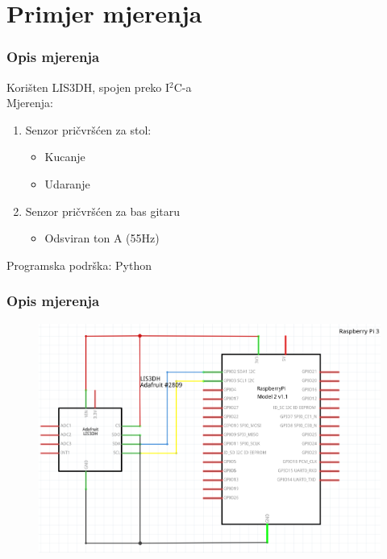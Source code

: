 \documentclass[12pt]{beamer}
\begin{document}
\section{Primjer mjerenja}
\begin{frame}
	\frametitle{Opis mjerenja}
	Korišten LIS3DH, spojen preko I$^2$C-a \\
	Mjerenja:
	\begin{enumerate}
		\item Senzor pričvršćen za stol:
		\begin{itemize}
			\item Kucanje
			\item Udaranje
		\end{itemize}
		\item Senzor pričvršćen za bas gitaru
			\begin{itemize}
			\item Odsviran ton A (55Hz)
		\end{itemize}
	\end{enumerate}
	Programska podrška: Python
\end{frame}

\begin{frame}
	\frametitle{Opis mjerenja}
	\begin{figure}[h]
		\centering
		\includegraphics[width=0.8\linewidth]{slike/lisRpiI2C.png}
	\end{figure}
\end{frame}
\end{document}
